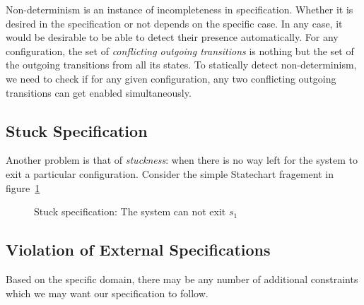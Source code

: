 \documentclass[12pt,a4paper]{report}
\begin{document}
Non-determinism is an instance of incompleteness in specification. Whether it is desired in the specification or not depends on the specific case. In any case, it would be desirable to be able to detect their presence automatically. For any configuration, the set of \emph{conflicting outgoing transitions} is nothing but the set of the outgoing transitions from all its states. To statically detect non-determinism, we need to check if for any given configuration, any two conflicting outgoing transitions can get enabled simultaneously.


\subsection{Stuck Specification}
Another problem is that of \emph{stuckness}: when there is no way left for the system to exit a particular configuration. Consider the simple Statechart fragement in figure~\ref{f:stuck}

\begin{figure}[H]

\caption{Stuck specification: The system can not exit $s_1$}
\label{f:stuck}
\end{figure}

\subsection{Violation of External Specifications}
Based on the specific domain, there may be any number of additional constraints which we may want our specification to follow. 
\end{document}
